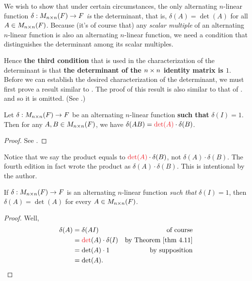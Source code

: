 We wish to show that under certain circumstances, the only alternating \(n\)-linear function \(\delta: M_{n \times n}(F) \to F\) \emph{is} the determinant,
that is, \(\delta(A) = \det(A)\) for all \(A \in M_{n \times n}(F)\).
Because (it's of course that) any \emph{scalar multiple} of an alternating \(n\)-linear function is also an alternating \(n\)-linear function, we need a condition that distinguishes the determinant among its scalar multiples.

Hence \textbf{the third condition} that is used in the characterization of the determinant is that \textbf{the determinant of the \(n \times n\) identity matrix is \(1\)}.
Before we can establish the desired characterization of the determinant, we must first prove a result similar to .
The proof of this result is also similar to that of . and so it is omitted.
(See .)

\begin{theorem} \label{thm 4.11}
Let \(\delta: M_{n \times n}(F) \to F\) be an alternating \(n\)-linear function \textbf{such that} \(\delta(I) = 1\).
Then for any \(A, B \in M_{n \times n}(F)\), we have \(\delta(AB) = \RED{\det(A)} \cdot \delta(B)\).
\end{theorem}

\begin{proof}
See .
\end{proof}

\begin{note}
Notice that we say the product equals to \(\RED{\det(A)} \cdot \delta(B)\), not \(\delta(A) \cdot \delta(B)\).
The fourth edition in fact wrote the product as \(\delta(A) \cdot \delta(B)\).
This is intentional by the author.
\end{note}

\begin{theorem} \label{thm 4.12}
If \(\delta: M_{n \times n}(F) \to F\) is an alternating \(n\)-linear function \emph{such that} \(\delta(I) = 1\), then \(\delta(A) = \det(A)\) for every \(A \in M_{n \times n}(F)\).
\end{theorem}

\begin{proof}
Well,
\begin{align*}
    \delta(A) & = \delta(AI) & \text{of course} \\
              & = \RED{\det}(A) \cdot \delta(I) & \text{by \THM{4.11}} \\
              & = \det(A) \cdot 1 & \text{by supposition} \\
              & = \det(A).
\end{align*}
\end{proof}


